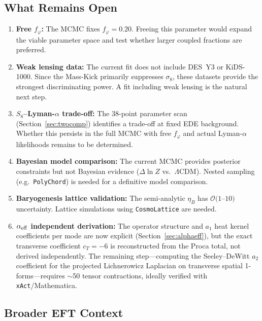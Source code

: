 \documentclass[a4paper,11pt]{article}
\newcommand{\LCDM}{$\Lambda$CDM}
\newcommand{\fphi}{f_\varphi}
\newcommand{\etaB}{\eta_B}
\begin{document}
\subsection{What Remains Open}

\begin{enumerate}[nosep]
\item \textbf{Free $\fphi$:} The MCMC fixes $\fphi = 0.20$. Freeing this parameter would expand the viable parameter space and test whether larger coupled fractions are preferred.

\item \textbf{Weak lensing data:} The current fit does not include DES~Y3 or KiDS-1000. Since the Mass-Kick primarily suppresses $\sigma_8$, these datasets provide the strongest discriminating power. A fit including weak lensing is the natural next step.

\item \textbf{$S_8$--Lyman-$\alpha$ trade-off:} The 38-point parameter scan (Section~\ref{sec:twocomp}) identifies a trade-off at fixed EDE background. Whether this persists in the full MCMC with free $\fphi$ and actual Lyman-$\alpha$ likelihoods remains to be determined.

\item \textbf{Bayesian model comparison:} The current MCMC provides posterior constraints but not Bayesian evidence ($\Delta\ln Z$ vs.\ \LCDM). Nested sampling (e.g.\ \texttt{PolyChord}) is needed for a definitive model comparison.

\item \textbf{Baryogenesis lattice validation:} The semi-analytic $\etaB$ has $\mathcal{O}(1$--$10)$ uncertainty. Lattice simulations using \texttt{CosmoLattice} are needed.

\item \textbf{$\alpha_{\rm eff}$ independent derivation:} The operator structure and $a_1$ heat kernel coefficients per mode are now explicit (Section~\ref{sec:alphaeff}), but the exact transverse coefficient $c_T = -6$ is reconstructed from the Proca total, not derived independently. The remaining step---computing the Seeley--DeWitt $a_2$ coefficient for the projected Lichnerowicz Laplacian on transverse spatial 1-forms---requires $\sim$50 tensor contractions, ideally verified with \texttt{xAct}/Mathematica.
\end{enumerate}

\subsection{Broader EFT Context}
\end{document}
